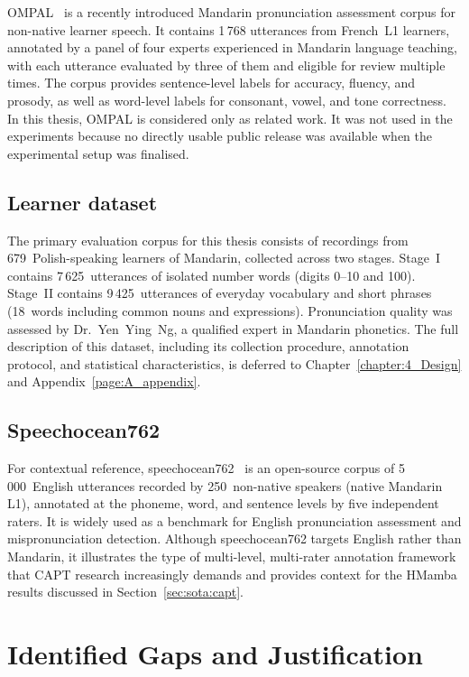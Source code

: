 OMPAL~\cite{hsieh2025ompal} is a recently introduced Mandarin pronunciation assessment corpus for non-native learner speech. It contains 1\,768 utterances from French~L1 learners, annotated by a panel of four experts experienced in Mandarin language teaching, with each utterance evaluated by three of them and eligible for review multiple times. The corpus provides sentence-level labels for accuracy, fluency, and prosody, as well as word-level labels for consonant, vowel, and tone correctness. In this thesis, OMPAL is considered only as related work. It was not used in the experiments because no directly usable public release was available when the experimental setup was finalised.

\subsection{Learner dataset}

The primary evaluation corpus for this thesis consists of recordings from 679~Polish-speaking learners of Mandarin, collected across two stages. Stage~I contains 7\,625~utterances of isolated number words (digits 0--10 and 100). Stage~II contains 9\,425~utterances of everyday vocabulary and short phrases (18~words including common nouns and expressions). Pronunciation quality was assessed by Dr.~Yen~Ying~Ng, a qualified expert in Mandarin phonetics. The full description of this dataset, including its collection procedure, annotation protocol, and statistical characteristics, is deferred to Chapter~\ref{chapter:4_Design} and Appendix~\ref{page:A_appendix}.

\subsection{Speechocean762}

For contextual reference, speechocean762~\cite{zhang2021speechocean} is an open-source corpus of 5\,000~English utterances recorded by 250~non-native speakers (native Mandarin L1), annotated at the phoneme, word, and sentence levels by five independent raters. It is widely used as a benchmark for English pronunciation assessment and mispronunciation detection. Although speechocean762 targets English rather than Mandarin, it illustrates the type of multi-level, multi-rater annotation framework that CAPT research increasingly demands and provides context for the HMamba results discussed in Section~\ref{sec:sota:capt}.

\section{Identified Gaps and Justification}
\label{sec:sota:gaps}


